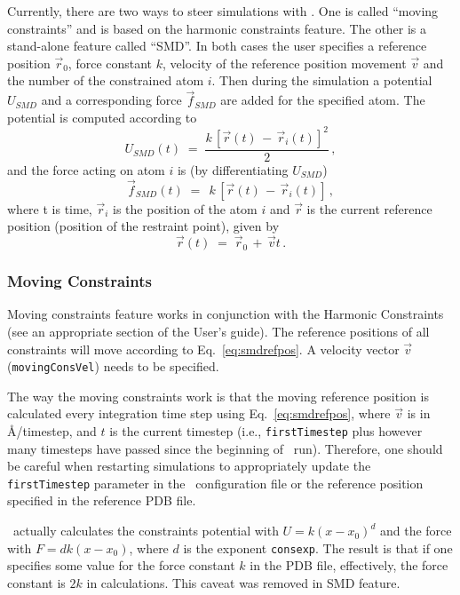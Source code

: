 Currently, there are two ways to steer simulations with \NAMD. One
is called ``moving constraints'' and is based on the harmonic
constraints feature. The other is a stand-alone feature called
``SMD''. In both cases the user specifies a reference position 
$\vec r_0$, force constant $k$, velocity of the reference position
movement $\vec v$ and the number of the constrained atom $i$. Then
during the simulation a potential $U_{SMD}$ and a corresponding force
$\vec f_{SMD}$ are added for the specified atom. 
The potential is computed according to
\begin{equation}
   U_{SMD}(t) \; = \; \frac{k \, [\vec r(t) \, - \, \vec r_i(t)]^2}{2} \, ,
\end{equation}
and the force acting on atom $i$ is (by differentiating $U_{SMD}$) 
\begin{equation}
   \vec f_{SMD}(t) \; = \; \, k \, [\vec r(t) \, - \, \vec r_i(t)] \, ,
\label{eq:smdforce}
\end{equation}
where t is time, $\vec r_i$ is the position of the atom $i$ and 
$\vec r$ is the current reference position (position of the restraint
point), given by 
\begin{equation}
   \vec r(t) \; = \; \vec r_0 \, + \, \vec v t \,.
\label{eq:smdrefpos}
\end{equation}

\subsubsection{Moving Constraints}

Moving constraints feature works in conjunction with the Harmonic
Constraints (see an appropriate section of the User's guide).
The reference positions of all constraints
will move according to Eq.~\ref{eq:smdrefpos}.
A velocity vector $\vec v$ ({\tt movingConsVel}) needs to be specified.

The way the moving constraints work is that the moving reference
position is calculated every integration time step using
Eq.~\ref{eq:smdrefpos}, where $\vec v$ is in \AA/timestep, and $t$ is the
current timestep (i.e., {\tt firstTimestep} plus however many
timesteps have passed since the beginning of \NAMD\ run). Therefore,
one should be careful when restarting simulations to appropriately
update the {\tt firstTimestep} parameter in the \NAMD\ configuration
file or the reference position specified in the reference PDB file.

 \NAMD\ actually calculates the constraints
potential with $U = k (x-x_0)^d$ and the force with $F = d k (x-x_0)$,
where $d$ is the exponent {\tt consexp}. The result is that if one
specifies some value for the force constant $k$ in the PDB file,
effectively, the force constant is $2 k$ in calculations. This caveat
was removed in SMD feature.


